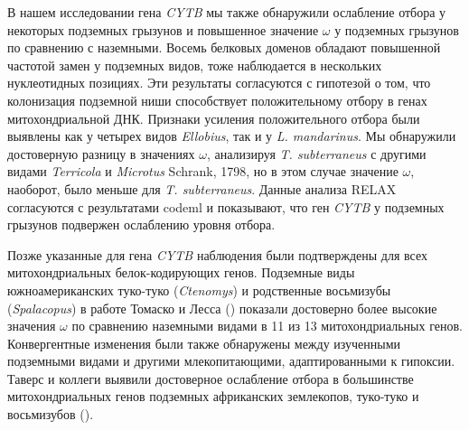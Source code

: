 
В нашем исследовании гена \textit{CYTB} мы также обнаружили ослабление отбора у некоторых подземных грызунов и повышенное значение $\omega$ у подземных грызунов по сравнению с наземными. Восемь белковых доменов обладают повышенной частотой замен у подземных видов, тоже наблюдается в нескольких нуклеотидных позициях. Эти результаты согласуются с гипотезой о том, что колонизация подземной ниши способствует положительному отбору в генах митохондриальной ДНК. Признаки усиления положительного отбора были выявлены как у четырех видов \textit{Ellobius}, так и у \textit{L. mandarinus}. Мы обнаружили достоверную разницу в значениях $\omega$, анализируя \textit{T. subterraneus} с другими видами \textit{Terricola} и \textit{Microtus} Schrank, 1798, но в этом случае значение $\omega$, наоборот, было меньше для \textit{T. subterraneus}. Данные анализа RELAX согласуются с результатами codeml и показывают, что ген \textit{CYTB} у подземных грызунов подвержен ослаблению уровня отбора.

Позже указанные для гена \textit{CYTB} наблюдения были подтверждены для всех митохондриальных белок-кодирующих генов. Подземные виды южноамериканских туко-туко (\textit{Ctenomys}) и родственные восьмизубы (\textit{Spalacopus}) в работе Томаско и Лесса (\cite{Tomasco2011}) показали достоверно более высокие значения $\omega$ по сравнению наземными видами в 11 из 13 митохондриальных генов. Конвергентные изменения были также обнаружены между изученными подземными видами и другими млекопитающими, адаптированными к гипоксии. Таверс и коллеги выявили достоверное ослабление отбора в большинстве митохондриальных генов подземных африканских землекопов, туко-туко и восьмизубов (\cite{Tavares2018}). 

